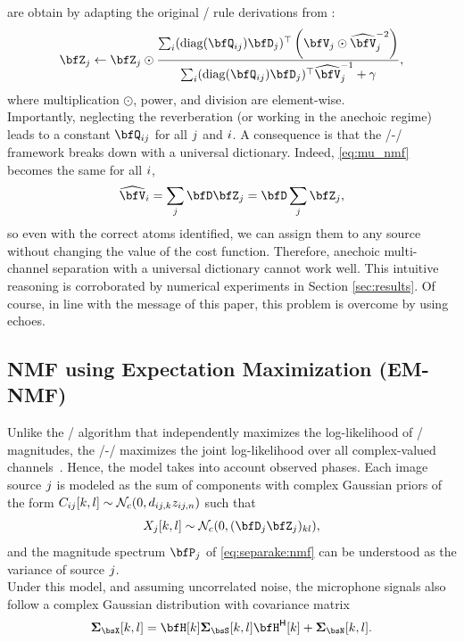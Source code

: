  are obtain by adapting the original \MU/ rule derivations from \citeauthor{ozerov2010multichannel}:
\begin{align}
    \mZ_\idxSrc \gets \mZ_\idxSrc \odot \frac{\sum_\idxMic (\diag(\vQ_{ij}) \mD_\idxSrc)^\top \left(\mV_\idxSrc \odot \wh{\mV}_\idxSrc^{-2}\right)}{\sum_\idxMic(\diag(\vQ_{ij}) \mD_\idxSrc)^\top \wh{\mV}_\idxSrc^{-1} + \gamma},
\end{align}
where multiplication $\odot$, power, and division are element-wise.
\\Importantly, neglecting the reverberation (or working in the anechoic regime) leads to a constant $\vQ_{\idxMicSrc}$ for all $j$ and $i$.
A consequence is that the \MU/-\NMF/ framework breaks down with a universal dictionary.
Indeed, \eqref{eq:mu_nmf} becomes the same for all $i$,
\begin{equation*}
    \wh{\mV}_\idxMic = \sum_{\idxSrc} \mD \mZ_\idxSrc = \mD \sum_\idxSrc \mZ_\idxSrc,
\end{equation*}
so even with the correct atoms identified, we can assign them to any source without changing
the value of the cost function. Therefore, anechoic multi-channel separation with a universal dictionary cannot work well.
This intuitive reasoning is corroborated by numerical experiments in Section \ref{sec:results}.
Of course, in line with the message of this paper, this problem is overcome by using echoes.


\subsection{NMF using Expectation Maximization (EM-NMF)}\label{sec:separake:em}
Unlike the \MU/ algorithm that independently maximizes the log-likelihood of \RTF/ magnitudes, the \EM/-\NMF/ maximizes the joint log-likelihood over all complex-valued channels~.
Hence, the model takes into account observed phases.
Each image source $j$ is modeled as the sum of components with complex Gaussian priors of the form $\IMG_{\idxMicSrc}[k,l]\sim \mathcal{N}_c\kparen{0, d_{\idxMicSrc,k}z_{\idxMicSrc,n}}$ such that
\begin{equation}
    \MIC_\idxSrc[k,l] \sim \mathcal{N}_c \kparen{0, (\mD_\idxSrc\mZ_\idxSrc)_{kl}},
\end{equation}
and the magnitude spectrum $\mP_\idxSrc$ of \eqref{eq:separake:nmf} can be understood as the variance of source $j$.
\\Under this model, and assuming uncorrelated noise, the microphone signals also follow a complex Gaussian distribution with covariance matrix
\begin{equation}
    \mSigma_{\MICS}[k,l] = \FLTSS[k] \mSigma_{\SRCS} [k,l] \khermitian{\FLTSS}[k] + \mSigma_{\NSES}[k,l].
\end{equation}

